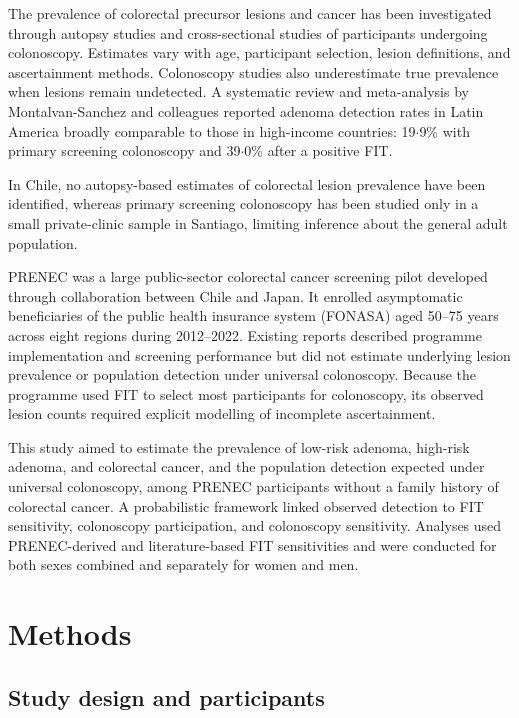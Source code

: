 \documentclass[10pt,a4paper]{article}
\newcommand{\dec}{\ensuremath{\cdot}}
\begin{document}
The prevalence of colorectal precursor lesions and cancer has been
investigated through autopsy studies and cross-sectional studies of
participants undergoing colonoscopy.\cite{Wang2023,Heitman2009} Estimates
vary with age, participant selection, lesion definitions, and ascertainment
methods. Colonoscopy studies also underestimate true prevalence when lesions
remain undetected.\cite{Zhao2019} A systematic review and meta-analysis by
Montalvan-Sanchez and colleagues reported adenoma detection rates in Latin
America broadly comparable to those in high-income countries: 19\dec{}9\%
with primary screening colonoscopy and 39\dec{}0\% after a positive
FIT.\cite{Montalvan2024}

In Chile, no autopsy-based estimates of colorectal lesion prevalence have
been identified, whereas primary screening colonoscopy has been studied only
in a small private-clinic sample in Santiago, limiting inference about the
general adult population.\cite{Silva2011}

PRENEC was a large public-sector colorectal cancer screening pilot developed
through collaboration between Chile and Japan.\cite{Okada2016} It enrolled
asymptomatic beneficiaries of the public health insurance system (FONASA)
aged 50--75 years across eight regions during 2012--2022. Existing reports
described programme implementation and screening performance but did not
estimate underlying lesion prevalence or population detection under
universal colonoscopy. Because the programme used FIT to select most
participants for colonoscopy, its observed lesion counts required explicit
modelling of incomplete ascertainment.

This study aimed to estimate the prevalence of low-risk adenoma, high-risk
adenoma, and colorectal cancer, and the population detection expected under
universal colonoscopy, among PRENEC participants without a family history of
colorectal cancer. A probabilistic framework linked observed detection to
FIT sensitivity, colonoscopy participation, and colonoscopy sensitivity.
Analyses used PRENEC-derived and literature-based FIT sensitivities and
were conducted for both sexes combined and separately for women and men.

\section*{Methods}

\subsection*{Study design and participants}
\end{document}
